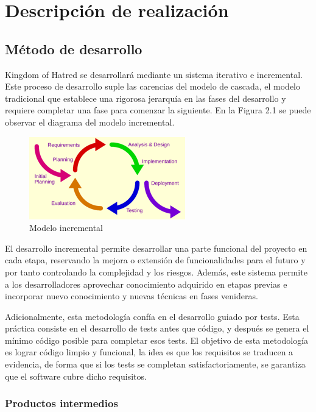 \chapter{Descripción de realización}

\section{Método de desarrollo}

Kingdom of Hatred se desarrollará mediante un sistema iterativo e incremental. Este proceso de desarrollo suple las carencias del modelo de cascada, el modelo tradicional que establece una rigorosa jerarquía en las fases del desarrollo y requiere completar una fase para comenzar la siguiente. En la Figura 2.1 se puede observar el diagrama del modelo incremental.

\begin{figure}[!htp]
 \centering
 \includegraphics{fig/modelo_incremental}
 \caption{Modelo incremental}
\end{figure}

El desarrollo incremental permite desarrollar una parte funcional del proyecto en cada etapa, reservando la mejora o extensión de funcionalidades para el futuro y por tanto controlando la complejidad y los riesgos. Además, este sistema permite a los desarrolladores aprovechar conocimiento adquirido en etapas previas e incorporar nuevo conocimiento y nuevas técnicas en fases venideras.

Adicionalmente, esta metodología confía en el desarrollo guiado por tests. Esta práctica consiste en el desarrollo de tests antes que código, y después se genera el mínimo código posible para completar esos tests. El objetivo de esta metodología es lograr código limpio y funcional, la idea es que los requisitos se traducen a evidencia, de forma que si los tests se completan satisfactoriamente, se garantiza que el software cubre dicho requisitos.

\subsection{Productos intermedios}

